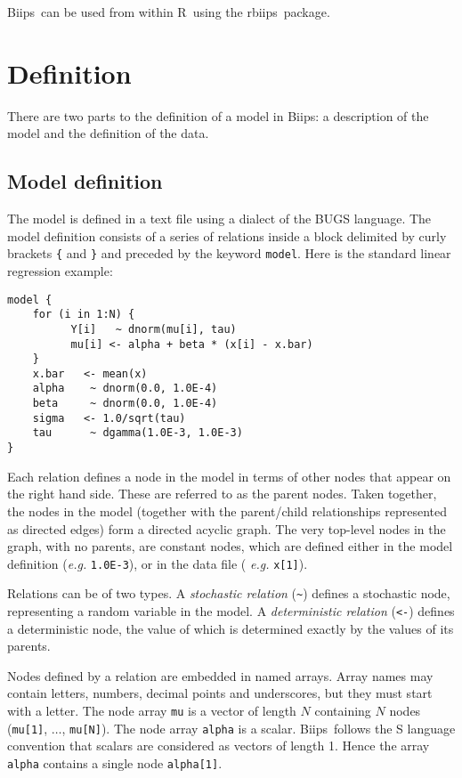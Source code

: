 \documentclass[11pt, a4paper, titlepage]{report}
\newcommand{\biips}{\textsf{Biips}}
\newcommand{\rbiips}{\textsf{rbiips}}
\newcommand{\R}{\textsf{R}}
\begin{document}
\biips\ can be used from within \R\ using the \rbiips\ package.

\section{Definition}

There are two parts to the definition of a model in \biips: a
description of the model and the definition of the data.

\subsection{Model definition}

The model is defined in a text file using a dialect of the
BUGS language.  The model definition consists of a series of
relations inside a block delimited by curly brackets \verb+{+ and
\verb+}+ and preceded by the keyword \verb+model+. Here is the standard
linear regression example:

\begin{verbatim}
model {
    for (i in 1:N) {
          Y[i]   ~ dnorm(mu[i], tau)
          mu[i] <- alpha + beta * (x[i] - x.bar)
    }
    x.bar   <- mean(x)
    alpha    ~ dnorm(0.0, 1.0E-4)
    beta     ~ dnorm(0.0, 1.0E-4)
    sigma   <- 1.0/sqrt(tau)
    tau      ~ dgamma(1.0E-3, 1.0E-3)
}
\end{verbatim}

Each relation defines a node in the model in terms of other nodes that
appear on the right hand side. These are referred to as the parent
nodes. Taken together, the nodes in the model (together with the
parent/child relationships represented as directed edges) form a
directed acyclic graph. The very top-level nodes in the graph, with no
parents, are constant nodes, which are defined either in the model
definition ({\em e.g.}  \verb+1.0E-3+), or in the data file ({\em
  e.g.}  \verb+x[1]+).

Relations can be of two types. A {\em stochastic relation} (\verb+~+)
defines a stochastic node, representing a random variable in the
model. A {\em deterministic relation} (\verb+<-+) defines a
deterministic node, the value of which is determined exactly by the
values of its parents.

Nodes defined by a relation are embedded in named arrays. Array names may
contain letters, numbers, decimal points and underscores, but they must
start with a letter.  The node array \verb+mu+ is a vector of length
$N$ containing $N$ nodes (\verb+mu[1]+, $\ldots$, \verb+mu[N]+). The
node array \verb+alpha+ is a scalar.  \biips\ follows the S language
convention that scalars are considered as vectors of length 1. Hence
the array \verb+alpha+ contains a single node \verb+alpha[1]+.
\end{document}

